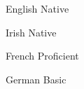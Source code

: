 

\begin{cvskills}

  \cvskill
    {English} %
    {Native} %

  \cvskill
    {Irish} %
    {Native} %

  \cvskill
    {French} %
    {Proficient} %

  \cvskill
    {German} %
    {Basic} %

\end{cvskills}
